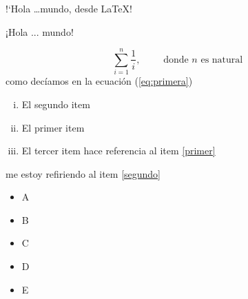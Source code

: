 \documentclass[12pt]{article}
\begin{document}
!`Hola \ldots mundo, desde \LaTeX!

¡Hola ... mundo!


\begin{equation}
  \label{eq:primera}
  \sum_{i=1}^{n}\frac{1}{i},\qquad\text{ donde } n \text{ es natural }
\end{equation}
como decíamos en la ecuación (\ref{eq:primera})

\begin{enumerate}[i)]
\item El segundo item \label{segundo}
\item El primer item \label{primer}
\item El tercer item \label{tercer} hace referencia al item \ref{primer}
\end{enumerate}

me estoy refiriendo al item \ref{segundo}

\begin{itemize}
\item A
\item B
\item C
\item D
\item E
\end{itemize}
\end{document}
